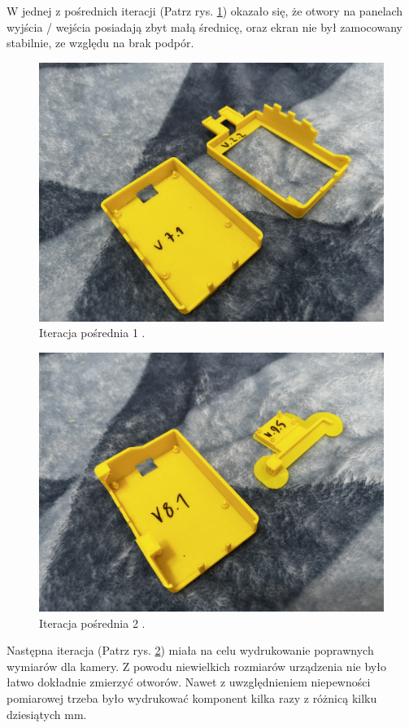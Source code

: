 \documentclass[a4paper,12pt,reqno]{article}
\begin{document}
\newpage
W jednej z pośrednich iteracji (Patrz rys. \ref{PDCA_01}) okazało się, że otwory na panelach wyjścia / wejścia posiadają zbyt małą średnicę, oraz ekran nie był zamocowany stabilnie, ze względu na brak podpór.

\begin{figure}[H]%
\centering
\includegraphics[width=0.8\columnwidth]{imgs/print_1.jpg}
\caption{Iteracja pośrednia 1 \cite{img_me}. \label{PDCA_01}}
\quad
\end{figure}

\begin{figure}[H]%
\centering
\includegraphics[width=0.8\columnwidth]{imgs/print_2.jpg}
\caption{Iteracja pośrednia 2 \cite{img_me}. \label{PDCA_02}}
\quad
\end{figure}

Następna iteracja (Patrz rys. \ref{PDCA_02}) miała na celu wydrukowanie poprawnych wymiarów dla kamery. Z powodu niewielkich rozmiarów urządzenia nie było łatwo dokładnie zmierzyć otworów. Nawet z uwzględnieniem niepewności pomiarowej trzeba było wydrukować komponent kilka razy z różnicą kilku dziesiątych mm.
\end{document}
